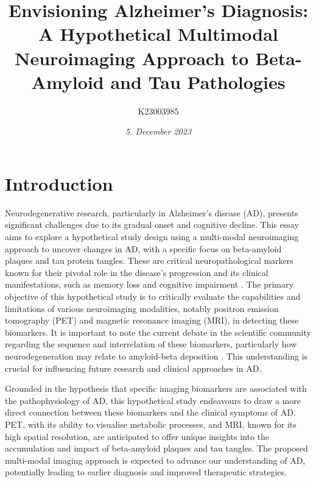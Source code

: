 \documentclass[10pt]{article}
\title{\textbf{Envisioning Alzheimer's Diagnosis: }\\A Hypothetical Multimodal Neuroimaging Approach to Beta-Amyloid and Tau Pathologies}
\author[ ]{K23003985}
\date{\textit{5. December 2023}}
\begin{document}

\maketitle

\doublespacing

\begin{sloppypar} %





  \section{Introduction}
  \label{sec:introduction}

  Neurodegenerative research, particularly in Alzheimer’s disease (AD), presents significant challenges due to its gradual onset and cognitive decline. This essay aims to explore a hypothetical study design using a multi-modal neuroimaging approach to uncover changes in AD, with a specific focus on beta-amyloid plaques and tau protein tangles. These are critical neuropathological markers known for their pivotal role in the disease’s progression and its clinical manifestations, such as memory loss and cognitive impairment \citep{heneka_neuroinflammation_2015,marttinen_molecular_2018}. The primary objective of this hypothetical study is to critically evaluate the capabilities and limitations of various neuroimaging modalities, notably positron emission tomography (PET) and magnetic resonance imaging (MRI), in detecting these biomarkers. It is important to note the current debate in the scientific community regarding the sequence and interrelation of these biomarkers, particularly how neurodegeneration may relate to amyloid-beta deposition \citep{besson_cognitive_2015}. This understanding is crucial for influencing future research and clinical approaches in AD.

  Grounded in the hypothesis that specific imaging biomarkers are associated with the pathophysiology of AD, this hypothetical study endeavours to draw a more direct connection between these biomarkers and the clinical symptoms of AD. PET, with its ability to visualise metabolic processes, and MRI, known for its high spatial resolution, are anticipated to offer unique insights into the accumulation and impact of beta-amyloid plaques and tau tangles. The proposed multi-modal imaging approach is expected to advance our understanding of AD, potentially leading to earlier diagnosis and improved therapeutic strategies.


\end{sloppypar}
\end{document}
